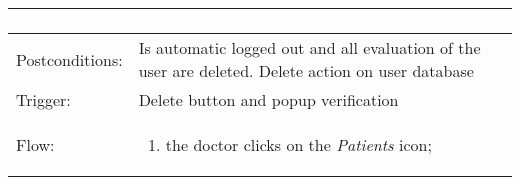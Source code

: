 \begin{longtable}{| p{3.5cm} | p{9cm} |}
\begin{enumerate}
\end{enumerate}\\
\hline
Postconditions: & Is automatic logged out and all evaluation of the user are deleted. Delete action on user database\\
\hline
Trigger: & Delete button and popup verification\\
\hline
Flow: &\mbox{}\par\vspace{-\baselineskip}
\begin{enumerate}
\item the doctor clicks on the \textit{Patients} icon;
\end{enumerate}\\
\hline
\end{longtable}

